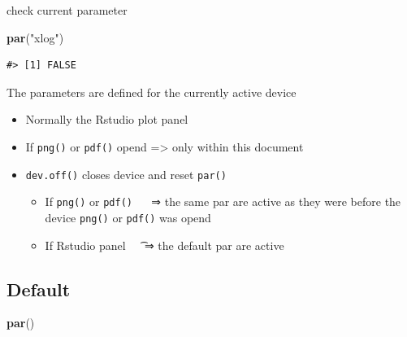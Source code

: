 \documentclass[]{book}
\newenvironment{Shaded}{\begin{snugshade}}{\end{snugshade}}
\newcommand{\KeywordTok}[1]{\textcolor[rgb]{0.13,0.29,0.53}{\textbf{#1}}}
\newcommand{\StringTok}[1]{\textcolor[rgb]{0.31,0.60,0.02}{#1}}
\newcommand{\NormalTok}[1]{#1}
\providecommand{\tightlist}{%
  \setlength{\itemsep}{0pt}\setlength{\parskip}{0pt}}
\begin{document}
check current parameter

\begin{Shaded}
\begin{Highlighting}[]
\KeywordTok{par}\NormalTok{(}\StringTok{"xlog"}\NormalTok{)}
\end{Highlighting}
\end{Shaded}

\begin{verbatim}
#> [1] FALSE
\end{verbatim}

The parameters are defined for the currently active device

\begin{itemize}
\tightlist
\item
  Normally the Rstudio plot panel
\item
  If \texttt{png()} or \texttt{pdf()} opend =\textgreater{} only within
  this document
\item
  \texttt{dev.off()} closes device and reset \texttt{par()}

  \begin{itemize}
  \tightlist
  \item
    If \texttt{png()} or \texttt{pdf()}   ⇒ the same par are active as
    they were before the device \texttt{png()} or \texttt{pdf()} was
    opend
  \item
    If Rstudio panel \t   ⇒ the default par are active
  \end{itemize}
\end{itemize}

\subsection{Default}\label{default}

\begin{Shaded}
\begin{Highlighting}[]
\KeywordTok{par}\NormalTok{()}
\end{Highlighting}
\end{Shaded}
\end{document}
